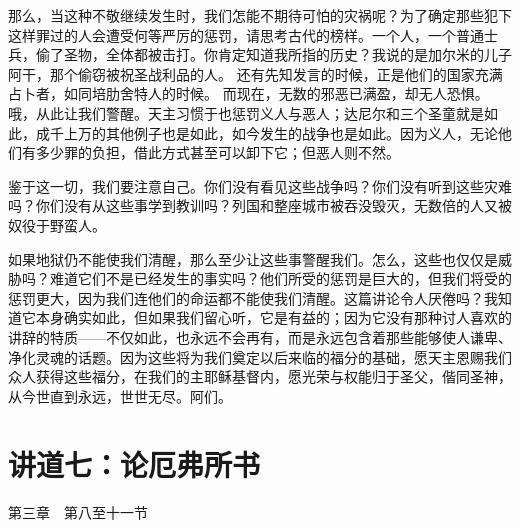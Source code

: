那么，当这种不敬继续发生时，我们怎能不期待可怕的灾祸呢？为了确定那些犯下这样罪过的人会遭受何等严厉的惩罚，请思考古代的榜样。一个人，一个普通士兵，偷了圣物，全体都被击打。你肯定知道我所指的历史？我说的是加尔米的儿子阿干，那个偷窃被祝圣战利品的人。 还有先知发言的时候，正是他们的国家充满占卜者，如同培肋舍特人的时候。 而现在，无数的邪恶已满盈，却无人恐惧。哦，从此让我们警醒。天主习惯于也惩罚义人与恶人；达尼尔和三个圣童就是如此，成千上万的其他例子也是如此，如今发生的战争也是如此。因为义人，无论他们有多少罪的负担，借此方式甚至可以卸下它；但恶人则不然。\par

鉴于这一切，我们要注意自己。你们没有看见这些战争吗？你们没有听到这些灾难吗？你们没有从这些事学到教训吗？列国和整座城市被吞没毁灭，无数倍的人又被奴役于野蛮人。\par

如果地狱仍不能使我们清醒，那么至少让这些事警醒我们。怎么，这些也仅仅是威胁吗？难道它们不是已经发生的事实吗？他们所受的惩罚是巨大的，但我们将受的惩罚更大，因为我们连他们的命运都不能使我们清醒。这篇讲论令人厌倦吗？我知道它本身确实如此，但如果我们留心听，它是有益的；因为它没有那种讨人喜欢的讲辞的特质——不仅如此，也永远不会再有，而是永远包含着那些能够使人谦卑、净化灵魂的话题。因为这些将为我们奠定以后来临的福分的基础，愿天主恩赐我们众人获得这些福分，在我们的主耶稣基督内，愿光荣与权能归于圣父，偕同圣神，从今世直到永远，世世无尽。阿们。\par



\section{讲道七：论厄弗所书}

第三章　第八至十一节 \par

\par

